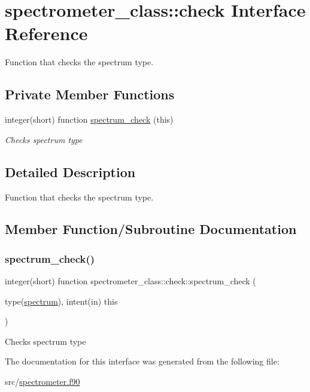 \hypertarget{interfacespectrometer__class_1_1check}{}\section{spectrometer\+\_\+class\+:\+:check Interface Reference}
\label{interfacespectrometer__class_1_1check}


Function that checks the spectrum type.  


\subsection*{Private Member Functions}
\begin{DoxyCompactItemize}
\item 
integer(short) function \hyperlink{interfacespectrometer__class_1_1check_a1d14d7c8751b28855644e3d7ab669260}{spectrum\+\_\+check} (this)
\begin{DoxyCompactList}\small\item\em Checks spectrum type \end{DoxyCompactList}\end{DoxyCompactItemize}


\subsection{Detailed Description}
Function that checks the spectrum type. 

\subsection{Member Function/\+Subroutine Documentation}
\mbox{\label{interfacespectrometer__class_1_1check_a1d14d7c8751b28855644e3d7ab669260}} 
\subsubsection{\texorpdfstring{spectrum\+\_\+check()}{spectrum\_check()}}
{\footnotesize\ttfamily integer(short) function spectrometer\+\_\+class\+::check\+::spectrum\+\_\+check (\begin{DoxyParamCaption}\item[{type(\hyperlink{structspectrometer__class_1_1spectrum}{spectrum}), intent(in)}]{this }\end{DoxyParamCaption})\hspace{0.3cm}{\ttfamily [private]}}



Checks spectrum type 



The documentation for this interface was generated from the following file\+:\begin{DoxyCompactItemize}
\item 
src/\hyperlink{spectrometer_8f90}{spectrometer.\+f90}\end{DoxyCompactItemize}
